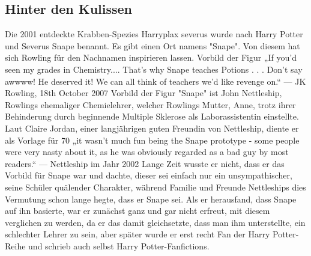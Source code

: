 \documentclass[a4paper, 10pt]{article}
\begin{document}
\subsection*{\Large Hinter den Kulissen}
Die 2001 entdeckte Krabben-Spezies Harryplax severus wurde nach Harry Potter und Severus Snape benannt.
\vspace{10pt}
\newline
Es gibt einen Ort namens "Snape". Von diesem hat sich Rowling für den Nachnamen inspirieren lassen.
Vorbild der Figur
\vspace{10pt}
\newline
„If you'd seen my grades in Chemistry.... That's why Snape teaches Potions . . . Don't say awwww! He deserved it! We can all think of teachers we'd like revenge on.“
\vspace{10pt}
\newline
— JK Rowling, 18th October 2007
\vspace{10pt}
\newline
Vorbild der Figur "Snape" ist John Nettleship, Rowlings ehemaliger Chemielehrer, welcher Rowlings Mutter, Anne, trotz ihrer Behinderung durch beginnende Multiple Sklerose als Laborassistentin einstellte. Laut Claire Jordan, einer langjährigen guten Freundin von Nettleship, diente er als Vorlage für 70 %
\vspace{10pt}
\newline
„it wasn't much fun being the Snape prototype - some people were very nasty about it, as he was obviously regarded as a bad guy by most readers.“
— Nettleship im Jahr 2002
\vspace{10pt}
\newline
Lange Zeit wusste er nicht, dass er das Vorbild für Snape war und dachte, dieser sei einfach nur ein unsympathischer, seine Schüler quälender Charakter, während Familie und Freunde Nettleships dies Vermutung schon lange hegte, dass er Snape sei. Als er herausfand, dass Snape auf ihn basierte, war er zunächst ganz und gar nicht erfreut, mit diesem verglichen zu werden, da er das damit gleichsetzte, dass man ihm unterstellte, ein schlechter Lehrer zu sein, aber später wurde er erst recht Fan der Harry Potter-Reihe und schrieb auch selbst Harry Potter-Fanfictions.
\end{document}
